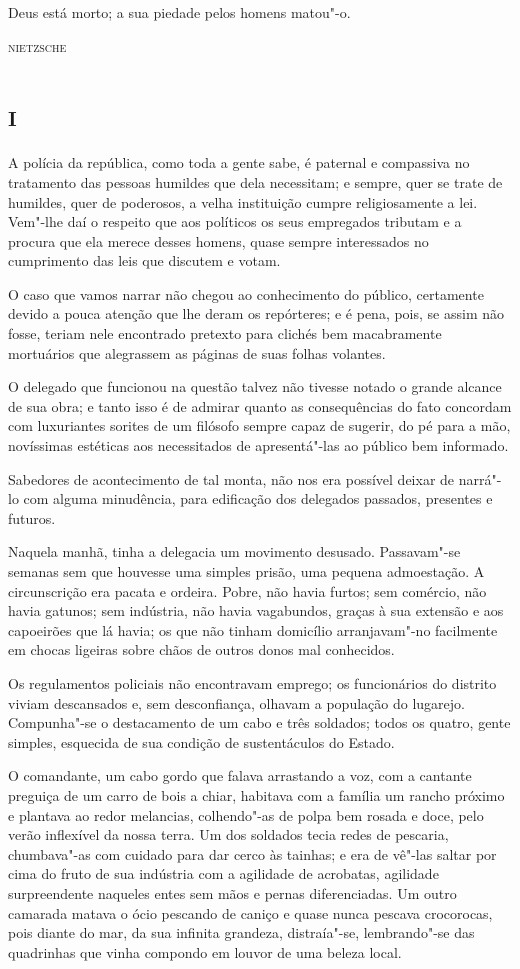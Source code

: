 \epigraph{Deus está morto; a sua piedade pelos homens matou"-o.}{\textsc{nietzsche}}

\section*{\textsc{i}}

\noindent{}A polícia da república, como toda a gente sabe, é paternal e compassiva
no tratamento das pessoas humildes que dela necessitam; e sempre, quer
se trate de humildes, quer de poderosos, a velha instituição cumpre
religiosamente a lei. Vem"-lhe daí o respeito que aos políticos os seus
empregados tributam e a procura que ela merece desses homens, quase
sempre interessados no cumprimento das leis que discutem e votam.

O caso que vamos narrar não chegou ao conhecimento do público,
certamente devido a pouca atenção que lhe deram os repórteres; e é pena,
pois, se assim não fosse, teriam nele encontrado pretexto para clichés
bem macabramente mortuários que alegrassem as páginas de suas folhas
volantes.

O delegado que funcionou na questão talvez não tivesse notado o grande
alcance de sua obra; e tanto isso é de admirar quanto as consequências
do fato concordam com luxuriantes sorites de um filósofo sempre capaz de
sugerir, do pé para a mão, novíssimas estéticas aos necessitados de
apresentá"-las ao público bem informado.

Sabedores de acontecimento de tal monta, não nos era possível deixar de
narrá"-lo com alguma minudência, para edificação dos delegados passados,
presentes e futuros.

Naquela manhã, tinha a delegacia um movimento desusado. Passavam"-se
semanas sem que houvesse uma simples prisão, uma pequena admoestação. A
circunscrição era pacata e ordeira. Pobre, não havia furtos; sem
comércio, não havia gatunos; sem indústria, não havia vagabundos, graças
à sua extensão e aos capoeirões que lá havia; os que não tinham
domicílio arranjavam"-no facilmente em chocas ligeiras sobre chãos de
outros donos mal conhecidos.

Os regulamentos policiais não encontravam emprego; os funcionários do
distrito viviam descansados e, sem desconfiança, olhavam a população do
lugarejo. Compunha"-se o destacamento de um cabo e três soldados; todos
os quatro, gente simples, esquecida de sua condição de sustentáculos do
Estado.

O comandante, um cabo gordo que falava arrastando a voz, com a cantante
preguiça de um carro de bois a chiar, habitava com a família um rancho
próximo e plantava ao redor melancias, colhendo"-as de polpa bem rosada e
doce, pelo verão inflexível da nossa terra. Um dos soldados tecia redes
de pescaria, chumbava"-as com cuidado para dar cerco às tainhas; e era de
vê"-las saltar por cima do fruto de sua indústria com a agilidade de
acrobatas, agilidade surpreendente naqueles entes sem mãos e pernas
diferenciadas. Um outro camarada matava o ócio pescando de caniço e
quase nunca pescava crocorocas, pois diante do mar, da sua infinita
grandeza, distraía"-se, lembrando"-se das quadrinhas que vinha compondo em
louvor de uma beleza local.

